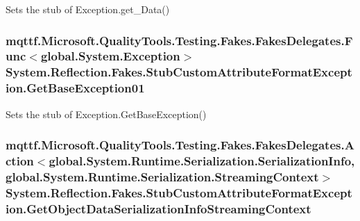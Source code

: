 Sets the stub of Exception.\-get\-\_\-\-Data()

\hypertarget{class_system_1_1_reflection_1_1_fakes_1_1_stub_custom_attribute_format_exception_afb5679f5e7b8db2f98decb8d5f20be60}{
\subsubsection[{Get\-Base\-Exception01}]{\setlength{\rightskip}{0pt plus 5cm}mqttf.\-Microsoft.\-Quality\-Tools.\-Testing.\-Fakes.\-Fakes\-Delegates.\-Func$<$global.\-System.\-Exception$>$ System.\-Reflection.\-Fakes.\-Stub\-Custom\-Attribute\-Format\-Exception.\-Get\-Base\-Exception01}}\label{class_system_1_1_reflection_1_1_fakes_1_1_stub_custom_attribute_format_exception_afb5679f5e7b8db2f98decb8d5f20be60}


Sets the stub of Exception.\-Get\-Base\-Exception()

\hypertarget{class_system_1_1_reflection_1_1_fakes_1_1_stub_custom_attribute_format_exception_a9f200ecb623f7360749e97744429532e}{
\subsubsection[{Get\-Object\-Data\-Serialization\-Info\-Streaming\-Context}]{\setlength{\rightskip}{0pt plus 5cm}mqttf.\-Microsoft.\-Quality\-Tools.\-Testing.\-Fakes.\-Fakes\-Delegates.\-Action$<$global.\-System.\-Runtime.\-Serialization.\-Serialization\-Info, global.\-System.\-Runtime.\-Serialization.\-Streaming\-Context$>$ System.\-Reflection.\-Fakes.\-Stub\-Custom\-Attribute\-Format\-Exception.\-Get\-Object\-Data\-Serialization\-Info\-Streaming\-Context}}\label{class_system_1_1_reflection_1_1_fakes_1_1_stub_custom_attribute_format_exception_a9f200ecb623f7360749e97744429532e}



